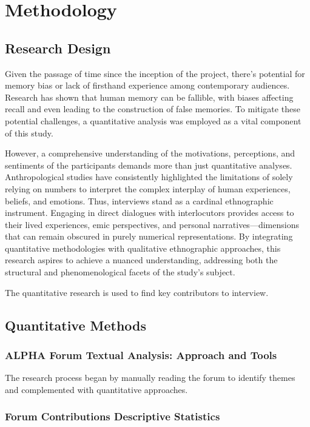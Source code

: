 \documentclass{article}
\begin{document}
\section{Methodology}

\subsection{Research Design}
Given the passage of time since the inception of the project, there's potential for memory bias or lack of firsthand experience among contemporary audiences. Research has shown that human memory can be fallible, with biases affecting recall and even leading to the construction of false memories. To mitigate these potential challenges, a quantitative analysis was employed as a vital component of this study.

However, a comprehensive understanding of the motivations, perceptions, and sentiments of the participants demands more than just quantitative analyses. Anthropological studies have consistently highlighted the limitations of solely relying on numbers to interpret the complex interplay of human experiences, beliefs, and emotions. Thus, interviews stand as a cardinal ethnographic instrument. Engaging in direct dialogues with interlocutors provides access to their lived experiences, emic perspectives, and personal narratives—dimensions that can remain obscured in purely numerical representations. By integrating quantitative methodologies with qualitative ethnographic approaches, this research aspires to achieve a nuanced understanding, addressing both the structural and phenomenological facets of the study's subject.

The quantitative research is used to find key contributors to interview.
\subsection{Quantitative Methods}
\subsubsection{ALPHA Forum Textual Analysis: Approach and Tools}
The research process began by manually reading the forum to identify themes and complemented with quantitative approaches. 



\subsubsection{Forum Contributions Descriptive Statistics}
\end{document}
